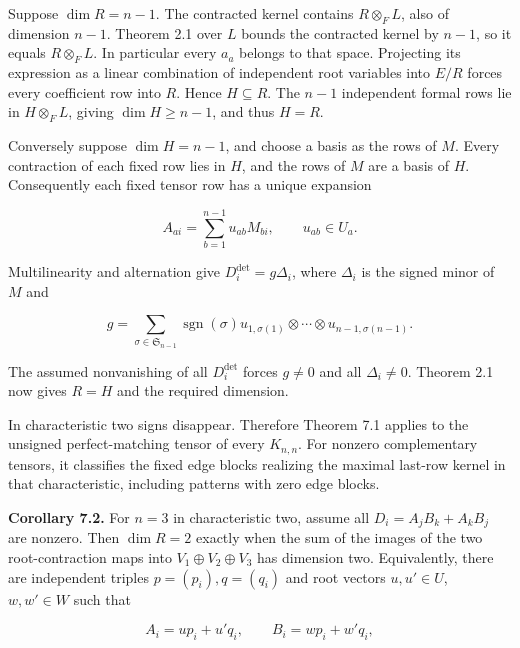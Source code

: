 \documentclass[11pt]{article}
\begin{document}
Suppose $\dim R=n-1$. The contracted kernel contains $R\otimes_F L$, also of dimension $n-1$. Theorem 2.1 over $L$ bounds the contracted kernel by $n-1$, so it equals $R\otimes_F L$. In particular every $a_a$ belongs to that space. Projecting its expression as a linear combination of independent root variables into $E/R$ forces every coefficient row into $R$. Hence $H\subseteq R$. The $n-1$ independent formal rows lie in $H\otimes_F L$, giving $\dim H\geq n-1$, and thus $H=R$.


Conversely suppose $\dim H=n-1$, and choose a basis as the rows of $M$. Every contraction of each fixed row lies in $H$, and the rows of $M$ are a basis of $H$. Consequently each fixed tensor row has a unique expansion


\nopagebreak[4]

\begin{equation}
A_{ai}=\sum_{b=1}^{n-1}u_{ab}M_{bi},\qquad u_{ab}\in U_a.
\tag{35}
\end{equation}

Multilinearity and alternation give $D_i^{\det}=g\Delta_i$, where $\Delta_i$ is the signed minor of $M$ and


\nopagebreak[4]

\begin{equation}
g=\sum_{\sigma\in\mathfrak S_{n-1}}\operatorname{sgn}(\sigma)
u_{1,\sigma(1)}\otimes\cdots\otimes u_{n-1,\sigma(n-1)}.
\tag{36}
\end{equation}

The assumed nonvanishing of all $D_i^{\det}$ forces $g\ne0$ and all $\Delta_i\ne0$. Theorem 2.1 now gives $R=H$ and the required dimension.


In characteristic two signs disappear. Therefore Theorem 7.1 applies to the unsigned perfect-matching tensor of every $K_{n,n}$. For nonzero complementary tensors, it classifies the fixed edge blocks realizing the maximal last-row kernel in that characteristic, including patterns with zero edge blocks.


\textbf{Corollary 7.2.} For $n=3$ in characteristic two, assume all $D_i=A_jB_k+A_kB_j$ are nonzero. Then $\dim R=2$ exactly when the sum of the images of the two root-contraction maps into $V_1\oplus V_2\oplus V_3$ has dimension two. Equivalently, there are independent triples $p=(p_i),q=(q_i)$ and root vectors $u,u'\in U$, $w,w'\in W$ such that


\nopagebreak[4]

\begin{equation}
A_i=up_i+u'q_i,\qquad B_i=wp_i+w'q_i,
\tag{37}
\end{equation}
\end{document}
